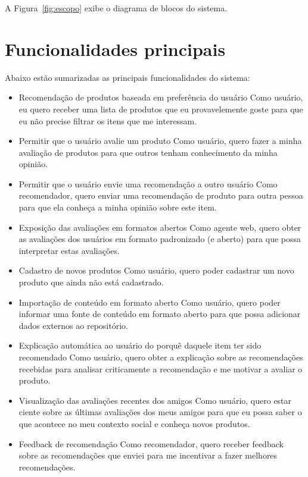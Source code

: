 A Figura~\ref{fig:escopo} exibe o diagrama de blocos do sistema.


\section{Funcionalidades principais} %
\label{sec:funcionalidades_principais}

Abaixo estão sumarizadas as principais funcionalidades do sistema:

\begin{itemize}

	\item Recomendação de produtos baseada em preferência do usuário
	\subitem Como usuário, eu quero receber uma lista de produtos que eu provavelemente goste para que eu não precise filtrar os itens que me interessam.

	\item Permitir que o usuário avalie um produto
  \subitem Como usuário, quero fazer a minha avaliação de produtos para que outros tenham conhecimento da minha opinião.

	\item Permitir que o usuário envie uma recomendação a outro usuário
  \subitem Como recomendador, quero enviar uma recomendação de produto para outra pessoa para que ela conheça a minha opinião sobre este item.

	\item Exposição das avaliações em formatos abertos
  \subitem Como agente web, quero obter as avaliações dos usuários em formato padronizado (e aberto) para que possa interpretar estas avaliações.

    \item Cadastro de novos produtos
    \subitem Como usuário, quero poder cadastrar um novo produto que ainda não está cadastrado.
    
    \item Importação de conteúdo em formato aberto
    \subitem Como usuário, quero poder informar uma fonte de conteúdo em formato aberto para que possa adicionar dados externos ao repositório.

    \item Explicação automática ao usuário do porquê daquele item ter sido recomendado
    \subitem Como usuário, quero obter a explicação sobre as recomendações recebidas para analisar criticamente a recomendação e me motivar a avaliar o produto.

    \item Visualização das avaliações recentes dos amigos
    \subitem Como usuário, quero estar ciente sobre as últimas avaliações dos meus amigos para que eu possa saber o que acontece no meu contexto social e conheça novos produtos.

    \item Feedback de recomendação
    \subitem Como recomendador, quero receber feedback sobre as recomendações que enviei para me incentivar a fazer melhores recomendações.

	
\end{itemize}

